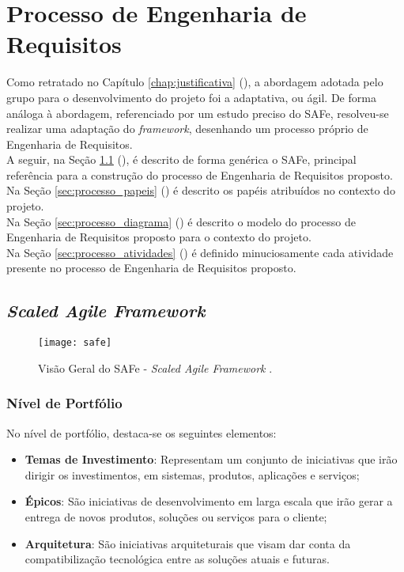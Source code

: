 \chapter[Processo de Engenharia de Requisitos]{Processo de Engenharia de Requisitos}
\label{chap:processo}
	Como retratado no Capítulo \ref{chap:justificativa} (), a abordagem adotada pelo grupo para o desenvolvimento do projeto foi a adaptativa, ou ágil. De forma análoga à abordagem, referenciado por um estudo preciso do SAFe, resolveu-se realizar uma adaptação do \emph{framework}, desenhando um processo próprio de Engenharia de Requisitos.
	\\ \indent A seguir, na Seção \ref{sec:processo_safe} (), é descrito de forma genérica o SAFe, principal referência para a construção do processo de Engenharia de Requisitos proposto.
	\\ \indent Na Seção \ref{sec:processo_papeis} () é descrito os papéis atribuídos no contexto do projeto.
	\\ \indent Na Seção \ref{sec:processo_diagrama} () é descrito o modelo do processo de Engenharia de Requisitos proposto para o contexto do projeto.
	\\ \indent Na Seção \ref{sec:processo_atividades} () é definido minuciosamente cada atividade presente no processo de Engenharia de Requisitos proposto.

	\newpage

	\begin{landscape}
		\section[\emph{Scaled Agile Framework}]{\emph{Scaled Agile Framework}}
		\label{sec:processo_safe}
			\begin{figure}[h]
				\centering
				\texttt{[image: safe]}
				\caption[\emph{Scaled Agile Framework}]{Visão Geral do SAFe - \emph{Scaled Agile Framework} \cite{safe}.}
				\label{fig:modelo_processo}
			\end{figure}
	\end{landscape}

		\subsection[Nível de Portfólio]{Nível de Portfólio}
		\label{subsec:processo_safe_portfolio}
			No nível de portfólio, destaca-se os seguintes elementos:
			\begin{itemize}
				\item{\textbf{Temas de Investimento}: Representam um conjunto de iniciativas que irão dirigir os investimentos, em sistemas, produtos, aplicações e serviços;}
				\item{\textbf{Épicos}: São iniciativas de desenvolvimento em larga escala que irão gerar a entrega de novos produtos, soluções ou serviços para o cliente;}
				\item{\textbf{Arquitetura}: São iniciativas arquiteturais que visam dar conta da compatibilização tecnológica entre as soluções atuais e futuras.}
			\end{itemize}

